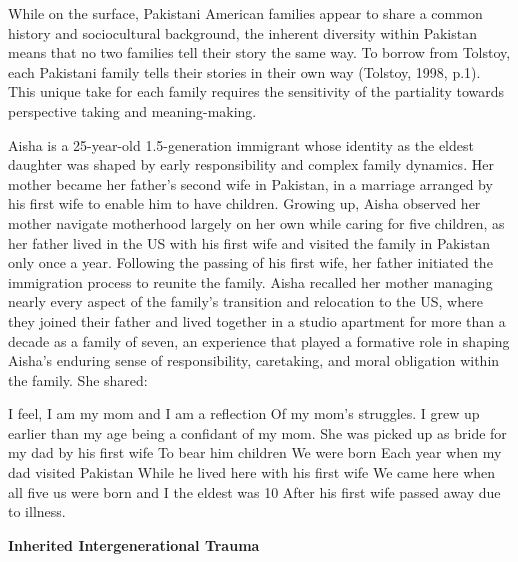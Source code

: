 While on the surface, Pakistani American families appear to share a common history and sociocultural background, the inherent diversity within Pakistan means that no two families tell their story the same way. To borrow from Tolstoy, each Pakistani family tells their stories in their own way (Tolstoy, 1998, p.1). This unique take for each family requires the sensitivity of the partiality towards perspective taking and meaning-making. 
 
Aisha is a 25-year-old 1.5-generation immigrant whose identity as the eldest daughter was shaped by early responsibility and complex family dynamics. Her mother became her father’s second wife in Pakistan, in a marriage arranged by his first wife to enable him to have children. Growing up, Aisha observed her mother navigate motherhood largely on her own while caring for five children, as her father lived in the US with his first wife and visited the family in Pakistan only once a year. Following the passing of his first wife, her father initiated the immigration process to reunite the family. Aisha recalled her mother managing nearly every aspect of the family’s transition and relocation to the US, where they joined their father and lived together in a studio apartment for more than a decade as a family of seven, an experience that played a formative role in shaping Aisha’s enduring sense of responsibility, caretaking, and moral obligation within the family. She shared:

\begin{FoundPoem}
    	I feel,
               I am my mom and 
I am a reflection 
Of
 my mom’s struggles.
I grew up earlier than my age
 being a confidant of my mom.
She was picked up as bride for my dad by his first wife
To bear him children
We were born 
Each year when my dad visited Pakistan
While he lived here with his first wife
We came here when all five us were born and I the eldest was 10
After his first wife passed away due to illness.
\end{FoundPoem}

\textbf{Inherited Intergenerational Trauma}

